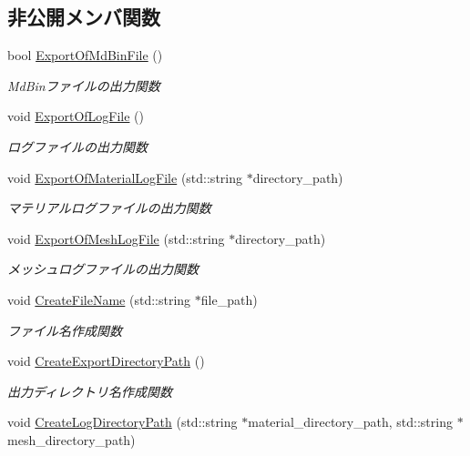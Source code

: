 \subsection*{非公開メンバ関数}
\begin{DoxyCompactItemize}
\item 
bool \mbox{\hyperlink{class_export_file_a16e769db1683d63e0e4dbf809bd8704e}{Export\+Of\+Md\+Bin\+File}} ()
\begin{DoxyCompactList}\small\item\em Md\+Binファイルの出力関数 \end{DoxyCompactList}\item 
void \mbox{\hyperlink{class_export_file_ab8a6f3c0bf115e400beb188bc95b3d5c}{Export\+Of\+Log\+File}} ()
\begin{DoxyCompactList}\small\item\em ログファイルの出力関数 \end{DoxyCompactList}\item 
void \mbox{\hyperlink{class_export_file_a1a5927dcc9f77a33c3cde8e0f15161f3}{Export\+Of\+Material\+Log\+File}} (std\+::string $\ast$directory\+\_\+path)
\begin{DoxyCompactList}\small\item\em マテリアルログファイルの出力関数 \end{DoxyCompactList}\item 
void \mbox{\hyperlink{class_export_file_a4469089d40e6b28e1468f100cb2edb9d}{Export\+Of\+Mesh\+Log\+File}} (std\+::string $\ast$directory\+\_\+path)
\begin{DoxyCompactList}\small\item\em メッシュログファイルの出力関数 \end{DoxyCompactList}\item 
void \mbox{\hyperlink{class_export_file_a183be4cce0cdd02ac41f5d02dc4499ee}{Create\+File\+Name}} (std\+::string $\ast$file\+\_\+path)
\begin{DoxyCompactList}\small\item\em ファイル名作成関数 \end{DoxyCompactList}\item 
void \mbox{\hyperlink{class_export_file_af2c0b760712fc2806e030e4d30fc9599}{Create\+Export\+Directory\+Path}} ()
\begin{DoxyCompactList}\small\item\em 出力ディレクトリ名作成関数 \end{DoxyCompactList}\item 
void \mbox{\hyperlink{class_export_file_aab917dac60913d7aa73d458a82c4e29d}{Create\+Log\+Directory\+Path}} (std\+::string $\ast$material\+\_\+directory\+\_\+path, std\+::string $\ast$mesh\+\_\+directory\+\_\+path)

\end{DoxyCompactItemize}
